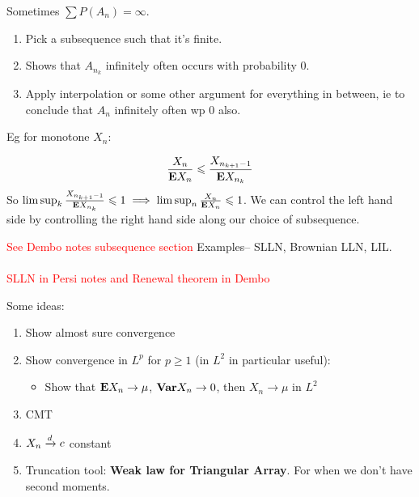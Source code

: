 \documentclass{article}
\newcommand\myworries[1]{\textcolor{red}{#1}}
\begin{document}
\begin{theorem}
Sometimes $\sum P(A_n) =\infty$. 
\begin{enumerate}
	\item Pick a subsequence such that it's finite. 
	\item Shows that $A_{n_k}$ infinitely often occurs with probability $0$.
	\item Apply interpolation or some other argument for everything in between, ie to conclude that $A_n$ infinitely often wp $0$ also. 
	
\end{enumerate}
Eg for monotone $X_n$:

$$ \frac{X_n}{\mathbf{E} X_n} \leqslant \frac{X_{n_{k+1} -1}}{\mathbf{E} X_{n_k}}$$
So $\limsup_k \frac{X_{n_{k+1} -1}}{\mathbf{E} X_{n_k}} \leqslant 1 \implies \limsup_n \frac{X_n}{\mathbf{E} X_n}\leqslant 1$. We can control the left hand side by controlling the right hand side along our choice of subsequence. 

\myworries{See Dembo notes subsequence section}
Examples-- SLLN, Brownian LLN, LIL. \\ \\

\myworries{SLLN in Persi notes and Renewal theorem in Dembo}

\end{theorem}

\begin{recipe}

Some ideas:
\begin{enumerate}
	\item Show almost sure convergence
	\item Show convergence in $L^p$ for $p\geq 1$ (in $L^2$ in particular useful):
	\begin{itemize}
		\item Show that $\mathbf{E} X_n \to \mu$, $\mathbf{Var} X_n \to 0$, then $X_n \to \mu$ in $L^2$
	\end{itemize}
	\item CMT 
	\item $X_n \xrightarrow{d} c$ constant
	\item Truncation tool: \textbf{Weak law for Triangular Array}. For when we don't have second moments. 
	\end{enumerate}
\end{recipe}
\end{document}
